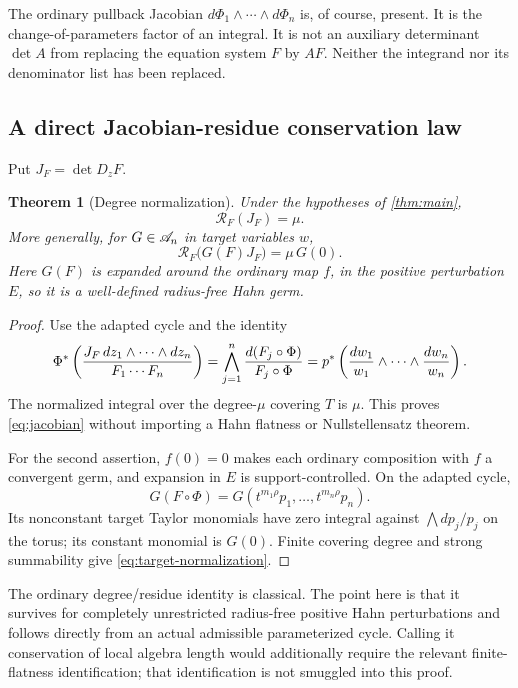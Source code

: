 \documentclass[11pt,letterpaper]{article}
\newtheorem{theorem}{Theorem}[section]
\theoremstyle{definition}
\theoremstyle{remark}
\numberwithin{equation}{section}
\begin{document}
The ordinary pullback Jacobian $d\Phi_1\wedge\cdots\wedge d\Phi_n$ is,
of course, present. It is the change-of-parameters factor of an integral. It
is not an auxiliary determinant $\det A$ from replacing the equation system
$F$ by $AF$. Neither the integrand nor its denominator list has been replaced.

\subsection{A direct Jacobian-residue conservation law}
Put $J_F=\det D_zF$.
\begin{theorem}[Degree normalization]\label{thm:normalization}
Under the hypotheses of \cref{thm:main},
\begin{equation}\label{eq:jacobian}
 \mathcal R_F(J_F)=\mu.
\end{equation}
More generally, for $G\in\mathscr A_n$ in target variables $w$,
\begin{equation}\label{eq:target-normalization}
 \mathcal R_F\bigl(G(F)J_F\bigr)=\mu\,G(0).
\end{equation}
Here $G(F)$ is expanded around the ordinary map $f$, in the positive
perturbation $E$, so it is a well-defined radius-free Hahn germ.
\end{theorem}
\begin{proof}
Use the adapted cycle and the identity
\[
 \Phi^*\left(\frac{J_F\,dz_1\wedge\cdots\wedge dz_n}{F_1\cdots F_n}\right)
 =\bigwedge_{j=1}^n\frac{d(F_j\circ\Phi)}{F_j\circ\Phi}
 =p^*\left(\frac{dw_1}{w_1}\wedge\cdots\wedge\frac{dw_n}{w_n}\right).
\]
The normalized integral over the degree-$\mu$ covering $T$ is $\mu$.
This proves \eqref{eq:jacobian} without importing a Hahn flatness or
Nullstellensatz theorem.

For the second assertion, $f(0)=0$ makes each ordinary composition with $f$
a convergent germ, and expansion in $E$ is support-controlled. On the adapted
cycle,
\[
 G(F\circ\Phi)=G(t^{m_1\rho}p_1,\ldots,t^{m_n\rho}p_n).
\]
Its nonconstant target Taylor monomials have zero integral against
$\bigwedge dp_j/p_j$ on the torus; its constant monomial is $G(0)$. Finite
covering degree and strong summability give \eqref{eq:target-normalization}.
\end{proof}

The ordinary degree/residue identity is classical. The point here is that it
survives for completely unrestricted radius-free positive Hahn perturbations
and follows directly from an actual admissible parameterized cycle. Calling it
conservation of local algebra length would additionally require the relevant
finite-flatness identification; that identification is not smuggled into this
proof.
\end{document}
